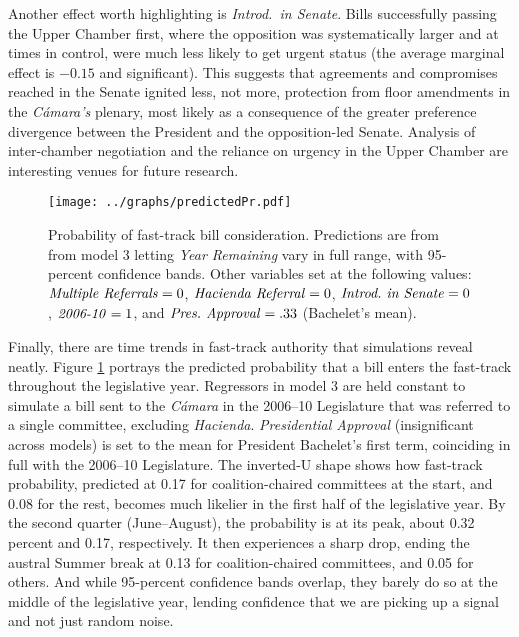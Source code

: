 \documentclass[letter,12pt]{article}
\begin{document}

Another effect worth highlighting is \emph{Introd.\ in Senate}. Bills successfully passing the Upper Chamber first, where the opposition was systematically larger and at times in control, were much less likely to get urgent status (the average marginal effect is $-0.15$ and significant). This suggests that agreements and compromises reached in the Senate ignited less, not more, protection from floor amendments in the \emph{Cámara's} plenary, most likely as a consequence of the greater preference divergence between the President and the opposition-led Senate. Analysis of inter-chamber negotiation and the reliance on urgency in the Upper Chamber are interesting venues for future research. 

\begin{figure}
  \centering
    \caption{Probability of fast-track bill consideration. Predictions are from from model 3 letting \emph{Year Remaining} vary in full range, with 95-percent confidence bands. Other variables set at the following values: $\text{\emph{Multiple Referrals}}=0$, $\text{\emph{Hacienda Referral}}=0$, $\text{\emph{Introd.~in~Senate}}=0$, $\text{\emph{2006-10}}=1$, and $\text{\emph{Pres.~Approval}}=.33$ (Bachelet's mean).}\label{F:sims}
    \texttt{[image: ../graphs/predictedPr.pdf]}
\end{figure}

Finally, there are time trends in fast-track authority that simulations reveal neatly. Figure \ref{F:sims} portrays the predicted probability that a bill enters the fast-track throughout the legislative year. Regressors in model 3 are held constant to simulate a bill sent to the \emph{Cámara} in the 2006--10 Legislature that was referred to a single committee, excluding \emph{Hacienda}. \emph{Presidential Approval} (insignificant across models) is set to the mean for President Bachelet's first term, coinciding in full with the 2006--10 Legislature. The inverted-U shape shows how fast-track probability, predicted at 0.17 for coalition-chaired committees at the start, and 0.08 for the rest, becomes much likelier in the first half of the legislative year. By the second quarter (June--August), the probability is at its peak, about 0.32 percent and 0.17, respectively. It then experiences a sharp drop, ending the austral Summer break at 0.13 for coalition-chaired committees, and 0.05 for others. And while 95-percent confidence bands overlap, they barely do so at the middle of the legislative year, lending confidence that we are picking up a signal and not just random noise. 
\end{document}
